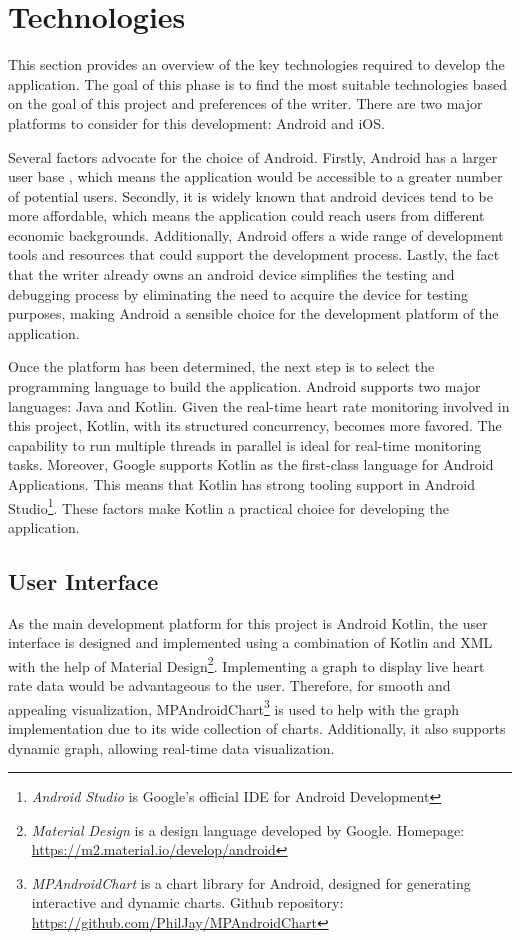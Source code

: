 \section{Technologies}
\label{chap:tech}
This section provides an overview of the key technologies required to develop the application. 
The goal of this phase is to find the most suitable technologies based on the goal of this project and preferences of the writer. 
There are two major platforms to consider for this development: Android and iOS.

Several factors advocate for the choice of Android. 
Firstly, Android has a larger user base \autocite{statcounter_os_market_share}, which means the application would be accessible to a greater number of potential users. 
Secondly, it is widely known that android devices tend to be more affordable, which means the application could reach users from different economic backgrounds.
Additionally, Android offers a wide range of development tools and resources that could support the development process.
Lastly, the fact that the writer already owns an android device simplifies the testing and debugging process by eliminating the need to acquire the device for testing purposes, making Android a sensible choice for the development platform of the application.

Once the platform has been determined, the next step is to select the programming language to build the application.
Android supports two major languages: Java and Kotlin. Given the real-time heart rate monitoring involved in this project, Kotlin, with its structured concurrency, becomes more favored. The capability to run multiple threads in parallel is ideal for real-time monitoring tasks.
Moreover, Google supports Kotlin as the first-class language for Android Applications. This means that Kotlin has strong tooling support in Android Studio\footnote{\emph{Android Studio} is Google's official IDE for Android Development}. \autocite{kotlin_android}
These factors make Kotlin a practical choice for developing the application.

\subsection{User Interface}
As the main development platform for this project is Android Kotlin, the user interface is designed and implemented using a combination of Kotlin and XML with the help of Material Design\footnote{\emph{Material Design} is a design language developed by Google. Homepage: \url{https://m2.material.io/develop/android}}.
Implementing a graph to display live heart rate data would be advantageous to the user. Therefore, for smooth and appealing visualization, MPAndroidChart\footnote{\emph{MPAndroidChart} is a chart library for Android, designed for generating interactive and dynamic charts. Github repository: \url{https://github.com/PhilJay/MPAndroidChart}} is used to help with the graph implementation due to its wide collection of charts. Additionally, it also supports dynamic graph, allowing real-time data visualization.
